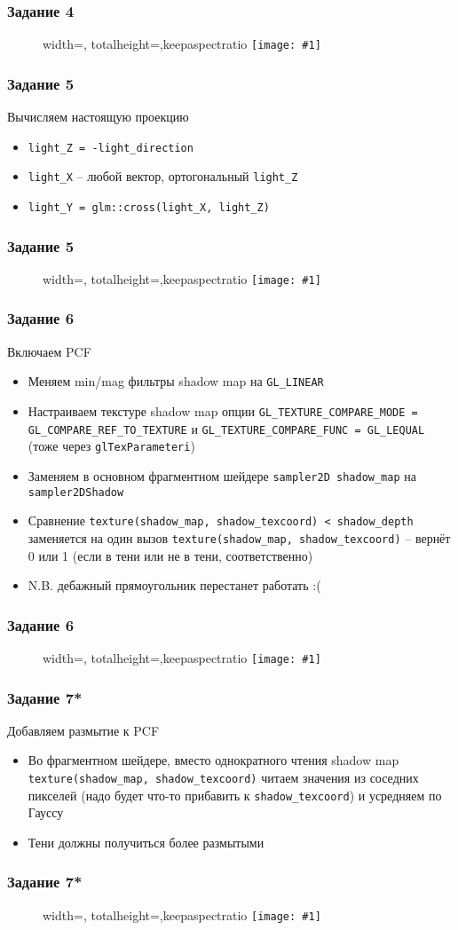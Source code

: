 \documentclass{beamer}
\newcommand{\slideimage}[1]{
  \begin{figure}
    \begin{adjustbox}{width=\textwidth, totalheight=\textheight-2\baselineskip-2\baselineskip,keepaspectratio}
      \texttt{[image: \#1]}
    \end{adjustbox}
  \end{figure}
}
\begin{document}
\begin{frame}[fragile]
\frametitle{Задание 4}
\slideimage{4.png}
\end{frame}

\begin{frame}[fragile]
\frametitle{Задание 5}
\fontsize{10pt}{10pt}
Вычисляем настоящую проекцию
\begin{itemize}
\item \verb|light_Z = -light_direction|
\item \verb|light_X| -- любой вектор, ортогональный \verb|light_Z|
\item \verb|light_Y = glm::cross(light_X, light_Z)|
\end{itemize}
\end{frame}

\begin{frame}[fragile]
\frametitle{Задание 5}
\slideimage{5.png}
\end{frame}

\begin{frame}[fragile]
\frametitle{Задание 6}
\fontsize{10pt}{10pt}
Включаем PCF
\begin{itemize}
\item Меняем min/mag фильтры shadow map на \verb|GL_LINEAR|
\item Настраиваем текстуре shadow map опции \verb|GL_TEXTURE_COMPARE_MODE = GL_COMPARE_REF_TO_TEXTURE| и \verb|GL_TEXTURE_COMPARE_FUNC = GL_LEQUAL| (тоже через \verb|glTexParameteri|)
\item Заменяем в основном фрагментном шейдере \verb|sampler2D shadow_map| на \verb|sampler2DShadow|
\item Сравнение \verb|texture(shadow_map, shadow_texcoord) < shadow_depth| заменяется на один вызов \verb|texture(shadow_map, shadow_texcoord)| -- вернёт 0 или 1 (если в тени или не в тени, соответственно)
\item N.B. дебажный прямоугольник перестанет работать :(
\end{itemize}
\end{frame}

\begin{frame}[fragile]
\frametitle{Задание 6}
\slideimage{6.png}
\end{frame}

\begin{frame}[fragile]
\frametitle{Задание 7*}
\fontsize{10pt}{10pt}
Добавляем размытие к PCF
\begin{itemize}
\item Во фрагментном шейдере, вместо однократного чтения shadow map \verb|texture(shadow_map, shadow_texcoord)| читаем значения из соседних пикселей (надо будет что-то прибавить к \verb|shadow_texcoord|) и усредняем по Гауссу
\item Тени должны получиться более размытыми
\end{itemize}
\end{frame}

\begin{frame}[fragile]
\frametitle{Задание 7*}
\slideimage{7.png}
\end{frame}
\end{document}
